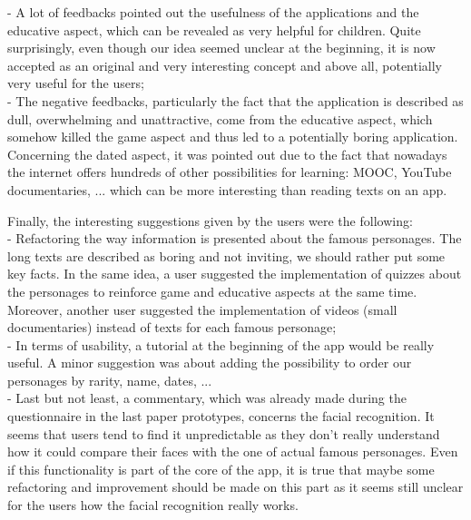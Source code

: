 \documentclass[12pt]{scrartcl}
\begin{document}
		- A lot of feedbacks pointed out the usefulness of the applications and the educative aspect, which can be revealed as very helpful for children. Quite surprisingly, even though our idea seemed unclear at the beginning, it is now accepted as an original and very interesting concept and above all, potentially very useful for the users;\\

		- The negative feedbacks, particularly the fact that the application is described as dull, overwhelming and unattractive, come from the educative aspect, which somehow killed the game aspect and thus led to a potentially boring application. Concerning the dated aspect, it was pointed out due to the fact that nowadays the internet offers hundreds of other possibilities for learning: MOOC, YouTube documentaries, ... which can be more interesting than reading texts on an app.\\
		\newline

	Finally, the interesting suggestions given by the users were the following:\\

		- Refactoring the way information is presented about the famous personages. The long texts are described as boring and not inviting, we should rather put some key facts. In the same idea, a user suggested the implementation of quizzes about the personages to reinforce game and educative aspects at the same time. Moreover, another user suggested the implementation of videos (small documentaries) instead of texts for each famous personage;\\

		- In terms of usability, a tutorial at the beginning of the app would be really useful. A minor suggestion was about adding the possibility to order our personages by rarity, name, dates, ...\\

		- Last but not least, a commentary, which was already made during the questionnaire in the last paper prototypes, concerns the facial recognition. It seems that users tend to find it unpredictable as they don’t really understand how it could compare their faces with the one of actual famous personages. Even if this functionality is part of the core of the app, it is true that maybe some refactoring and improvement should be made on this part as it seems still unclear for the users how the facial recognition really works.
		
		\newpage
\end{document}
